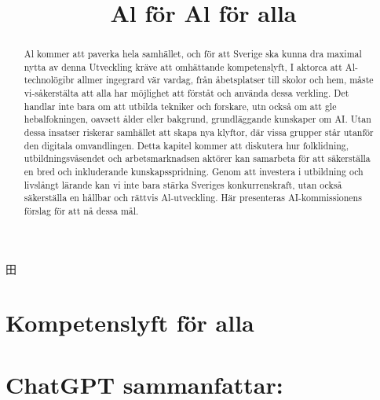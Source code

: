 {{{{{{{{田

\title{
Al för
}

\title{
Al för alla
}
\section*{Kompetenslyft för alla}
\section*{ChatGPT sammanfattar:}
\begin{abstract}
Al kommer att paverka hela samhället, och för att Sverige ska kunna dra maximal nytta av denna Utveckling kräve att omhättande kompetenslyft, I aktorca att Al-technolögibr allmer ingegrard vär vardag, från åbetsplatser till skolor och hem, måste vi-såkerstälta att alla har möjlighet att förståt och använda dessa verkling. Det handlar inte bara om att utbilda tekniker och forskare, utn också om att gle hebalfokningen, oavsett ålder eller bakgrund, grundläggande kunskaper om AI. Utan dessa insatser riskerar samhället att skapa nya klyftor, där vissa grupper står utanför den digitala omvandlingen.
Detta kapitel kommer att diskutera hur folklidning, utbildningsvåsendet och arbetsmarknadsen aktörer kan samarbeta för att säkerställa en bred och inkluderande kunskapsspridning. Genom att investera i utbildning och livslångt lärande kan vi inte bara stärka Sveriges konkurrenskraft, utan också säkerställa en hållbar och rättvis Al-utveckling. Här presenteras AI-kommissionens förslag för att nå dessa mål.
\end{abstract}
}}}}}}}}
